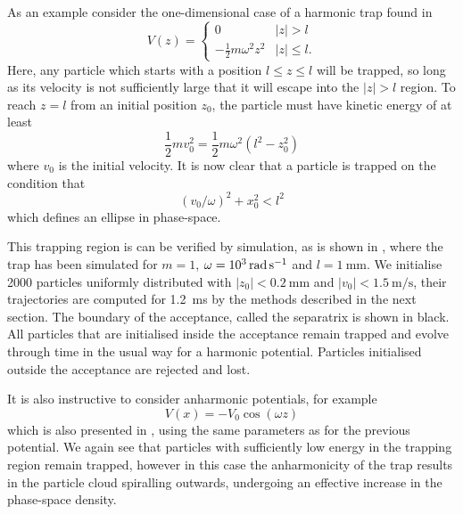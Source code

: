 As an example consider the one-dimensional case of a harmonic trap found in 
%
\begin{equation}
  V(z) = \begin{cases}
    0 & |z| > l \\
    -\frac{1}{2}m\omega^2 z^2 & |z| \leq l.
  \end{cases}
\end{equation}
%
Here, any particle which starts with a position $l \leq z \leq l$ will be
trapped, so long as its velocity is not sufficiently large that it will escape
into the $|z|> l$ region. To reach $z=l$ from an initial position $z_0$, the
particle must have kinetic energy of at least
%
\begin{equation}
  \frac{1}{2}mv_0^2 = \frac{1}{2}m\omega^2(l^2 - z_0^2)
\end{equation}
%
where $v_0$ is the initial velocity. It is now clear that a particle is trapped
on the condition that
%
\begin{equation}
  (v_0/\omega)^2 + x_0^2 < l^2
\end{equation}
%
which defines an ellipse in phase-space.


This trapping region is can be verified by simulation, as is shown in
, where the trap has been simulated for $m =
1$, $\omega = \SI[parse-numbers=false]{10^3}{\radian\per\second}$ and $l
=\SI{1}{\milli\meter}$. We initialise 2000 particles uniformly distributed with
$|z_0| < \SI{0.2}{\milli\meter}$ and $|v_0|< \SI{1.5}{\meter\per\second}$,
their trajectories are computed for \SI{1.2}{\milli\second} by the methods
described in the next section. The boundary of the acceptance, called the
separatrix is shown in black. All particles that are initialised inside the
acceptance remain trapped and evolve through time in the usual way for a
harmonic potential.  Particles initialised outside the acceptance are rejected
and lost.

It is also instructive to consider anharmonic potentials, for example
%
\begin{equation}
  V(x) = -V_0\cos(\omega z)
\end{equation}
%
which is also presented in , using the same
parameters as for the previous potential. We again see that particles with
sufficiently low energy in the trapping region remain trapped, however in this
case the anharmonicity of the trap results in the particle cloud spiralling
outwards, undergoing an effective increase in the phase-space density.

